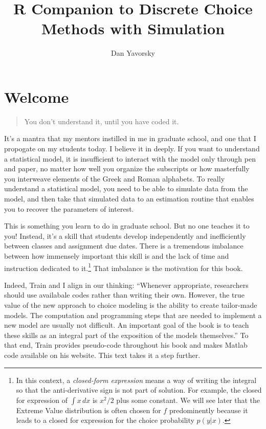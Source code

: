 \documentclass[
  letterpaper,
  DIV=11,
  numbers=noendperiod]{scrreprt}
\title{R Companion to Discrete Choice Methods with Simulation}
\author{Dan Yavorsky}
\date{}
\renewcommand*\contentsname{Table of contents}
\newcommand\contentsname{Table of contents}
\begin{document}
\maketitle

\renewcommand*\contentsname{Table of contents}
{
\hypersetup{linkcolor=}
\setcounter{tocdepth}{2}
\tableofcontents
}

\chapter*{Welcome}\label{welcome}


\begin{quote}
You don't understand it, until you have coded it.
\end{quote}

It's a mantra that my mentors instilled in me in graduate school, and
one that I propogate on my students today. I believe it in deeply. If
you want to understand a statistical model, it is insufficient to
interact with the model only through pen and paper, no matter how well
you organize the subscripts or how masterfully you interweave elements
of the Greek and Roman alphabets. To really understand a statistical
model, you need to be able to simulate data from the model, and then
take that simulated data to an estimation routine that enables you to
recover the parameters of interest.

This is something you learn to do in graduate school. But no one teaches
it to you! Instead, it's a skill that students develop independently and
inefficiently between classes and assignment due dates. There is a
tremendous imbalance between how immensely important this skill is and
the lack of time and instruction dedicated to it.\footnote{In this
  context, a \emph{closed-form expression} means a way of writing the
  integral so that the anti-derivative sign is not part of solution. For
  example, the closed for expression of \(\int x \, dx\) is \(x^2/2\)
  plus some constant. We will see later that the Extreme Value
  distribution is often chosen for \(f\) predominently because it leads
  to a closed for expression for the choice probability \(p(y|x)\).}
That imbalance is the motivation for this book.

Indeed, Train and I align in our thinking: ``Whenever appropriate,
researchers should use availabale codes rather than writing their own.
However, the true value of the new approach to choice modeling is the
ability to create tailor-made models. The computation and programming
steps that are needed to implement a new model are usually not
difficult. An important goal of the book is to teach these skills as an
integral part of the exposition of the models themselves.'' To that end,
Train provides pseudo-code throughout his book and makes Matlab code
available on his website. This text takes it a step further.
\end{document}

